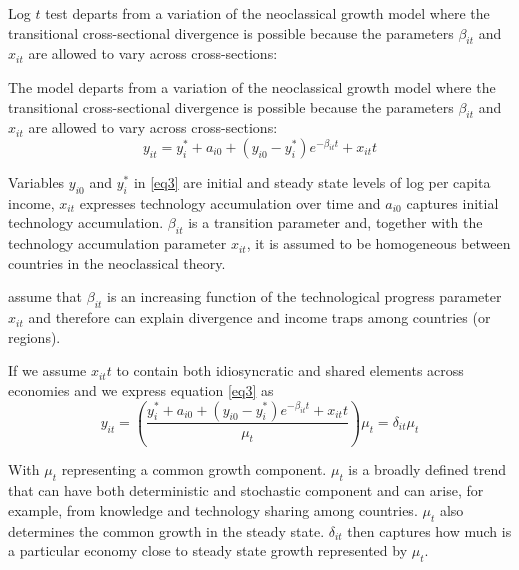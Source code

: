 \documentclass[11pt]{article}
\begin{document}
Log $t$ test departs from a variation of the neoclassical growth model where the transitional cross-sectional divergence is possible because the parameters $\beta_{it}$ and $x_{it}$ are allowed to vary across cross-sections:

The model departs from a variation of the neoclassical growth model where the transitional cross-sectional divergence is possible because the parameters $\beta_{it}$ and $x_{it}$ are allowed to vary across cross-sections:
\begin{equation} \label{eq3}
 y_{it} = y_i^* + a_{i0} + (y_{i0} - y_i^*)e^{-\beta_{it}t} + x_{it}t 
\end{equation}

 Variables $y_{i0}$ and $y_{i}^{*}$ in \eqref{eq3} are initial and steady state levels of log per capita income, $x_{it}$ expresses technology accumulation over time and $a_{i0}$ captures initial technology accumulation. $\beta_{it}$ is a transition parameter and, together with the technology accumulation parameter $x_{it}$, it is assumed to be homogeneous between countries in the neoclassical theory.

\citeauthor{phillips2007transition} assume that $\beta_{it}$ is an increasing function of the technological progress parameter $x_{it}$ and therefore can explain divergence and income traps among countries (or regions).

If we assume $x_{it}t$ to contain both idiosyncratic and shared elements across economies and we express equation \eqref{eq3} as
\begin{equation} \label{eq4} y_{it} = (\frac{ y_i^* + a_{i0} + (y_{i0} - y_i^*)e^{-\beta_{it}t} + x_{it}t}{\mu_t})\mu_t = \delta_{it}\mu_t  \end{equation}

With $\mu_t$ representing a common growth component.
$\mu_t$ is a broadly defined trend that can have both deterministic and stochastic component and can arise, for example, from knowledge and technology sharing among countries. $\mu_t$ also determines the common growth in the steady state. $\delta_{it}$ then captures how much is a particular economy close to steady state growth represented by $\mu_t$.
\end{document}
